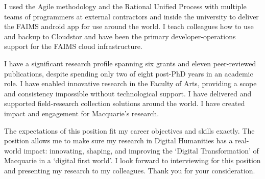 \documentclass[11pt, a4paper]{awesome-cv}
\begin{document}
\begin{cvletter}

I used the Agile methodology and the Rational Unified Process with multiple teams of programmers at external contractors and inside the university to deliver the FAIMS android app for use around the world. I teach colleagues how to use and backup to Cloudstor and have been the primary developer-operations support for the FAIMS cloud infrastructure. 





I have a significant research profile spanning six grants and eleven peer-reviewed publications, despite spending only two of eight post-PhD years in an academic role. I have enabled innovative research in the Faculty of Arts, providing a scope and consistency impossible without technological support. I have delivered and supported field-research collection solutions around the world. I have created impact and engagement for Macquarie's research.





The expectations of this position fit my career objectives and skills exactly. The position allows me to make sure my research in Digital Humanities has a real-world impact: innovating, shaping, and improving the `Digital Transformation' of Macquarie in a `digital first world'. I look forward to interviewing for this position and presenting my research to my colleagues. Thank you for your consideration.

\end{cvletter}




\makeletterclosing
\end{document}
